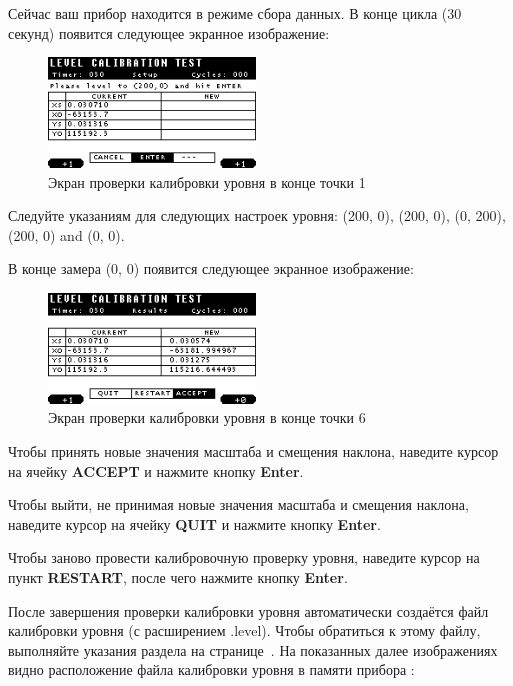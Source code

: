 Сейчас ваш прибор \cg{} находится в режиме сбора данных. В конце цикла (30 секунд)
появится следующее экранное изображение:

\begin{figure}[H]
  \centering
  \includegraphics[width=0.49\textwidth]{figures/the_level_calibration_test_screen_at_the_end_of_the_point_1}
  \caption{Экран проверки калибровки уровня в конце точки 1}
  \label{fig:the_level_calibration_test_screen_at_the_end_of_the_point_1}
\end{figure}

Следуйте указаниям для следующих настроек уровня: (200, 0), (\textminus{}200,
0), (0, 200), (\textminus{}200, 0) and (0, 0).

В конце замера (0, 0) появится следующее экранное изображение:

\begin{figure}[H]
  \centering
  \includegraphics[width=0.49\textwidth]{figures/the_level_clibration_test_screen_at_the_end_of_point_6}
  \caption{Экран проверки калибровки уровня в конце точки 6}
  \label{fig:the_level_clibration_test_screen_at_the_end_of_point_6}
\end{figure}

Чтобы принять новые значения масштаба и смещения наклона, наведите курсор на
ячейку \textbf{ACCEPT} и нажмите кнопку \textbf{Enter}.

Чтобы выйти, не принимая новые значения масштаба и смещения наклона,
наведите курсор на ячейку \textbf{QUIT} и нажмите кнопку \textbf{Enter}.

Чтобы заново провести калибровочную проверку уровня, наведите курсор на пункт
\textbf{RESTART}, после чего нажмите кнопку \textbf{Enter}.

После завершения проверки калибровки уровня автоматически создаётся файл
калибровки уровня (с расширением .level). Чтобы обратиться к этому файлу,
выполняйте указания раздела  на
странице~\pageref{subsec:taking_a_measurement}. На показанных далее изображениях
видно расположение файла калибровки уровня в памяти прибора \cg{}:

